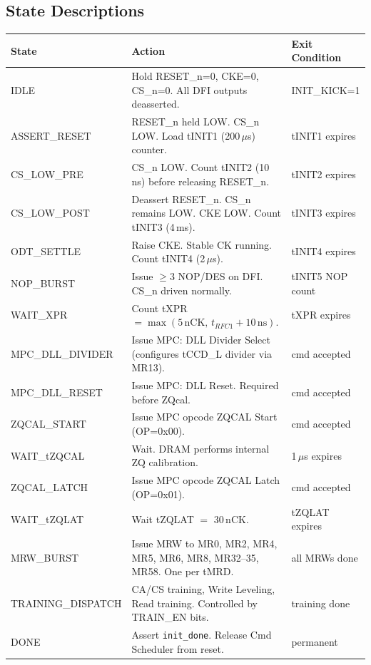 \documentclass[10pt,a4paper]{article}
\newcommand{\Th}[1]{\cellcolor{cellbg}\textbf{\small #1}}
\newcommand{\RA}{\rowcolor{white}}
\newcommand{\RB}{\rowcolor{altbg}}
\begin{document}
\subsection{State Descriptions}

\begin{center}
\begin{tabularx}{\linewidth}{@{} l X l @{}}
\toprule
\Th{State} & \Th{Action} & \Th{Exit Condition} \\
\midrule
\RA IDLE & Hold RESET\_n=0, CKE=0, CS\_n=0. All DFI outputs deasserted. & INIT\_KICK=1 \\
\RB ASSERT\_RESET & RESET\_n held LOW. CS\_n LOW. Load tINIT1 (200\,$\mu$s) counter. & tINIT1 expires \\
\RA CS\_LOW\_PRE & CS\_n LOW. Count tINIT2 (10\,ns) before releasing RESET\_n. & tINIT2 expires \\
\RB CS\_LOW\_POST & Deassert RESET\_n. CS\_n remains LOW. CKE LOW. Count tINIT3 (4\,ms). & tINIT3 expires \\
\RA ODT\_SETTLE & Raise CKE. Stable CK running. Count tINIT4 (2\,$\mu$s). & tINIT4 expires \\
\RB NOP\_BURST & Issue $\geq$3 NOP/DES on DFI. CS\_n driven normally. & tINIT5 NOP count \\
\RA WAIT\_XPR & Count tXPR $=\max(5\,\text{nCK},\,t_{RFC1}+10\,\text{ns})$. & tXPR expires \\
\RB MPC\_DLL\_DIVIDER & Issue MPC: DLL Divider Select (configures tCCD\_L divider via MR13). & cmd accepted \\
\RA MPC\_DLL\_RESET & Issue MPC: DLL Reset. Required before ZQcal. & cmd accepted \\
\RB ZQCAL\_START & Issue MPC opcode ZQCAL Start (OP=0x00). & cmd accepted \\
\RA WAIT\_tZQCAL & Wait. DRAM performs internal ZQ calibration. & 1\,$\mu$s expires \\
\RB ZQCAL\_LATCH & Issue MPC opcode ZQCAL Latch (OP=0x01). & cmd accepted \\
\RA WAIT\_tZQLAT & Wait tZQLAT $=$ 30\,nCK. & tZQLAT expires \\
\RB MRW\_BURST & Issue MRW to MR0, MR2, MR4, MR5, MR6, MR8, MR32--35, MR58. One per tMRD. & all MRWs done \\
\RA TRAINING\_DISPATCH & CA/CS training, Write Leveling, Read training. Controlled by TRAIN\_EN bits. & training done \\
\RB DONE & Assert \texttt{init\_done}. Release Cmd Scheduler from reset. & permanent \\
\bottomrule
\end{tabularx}
\end{center}
\end{document}
